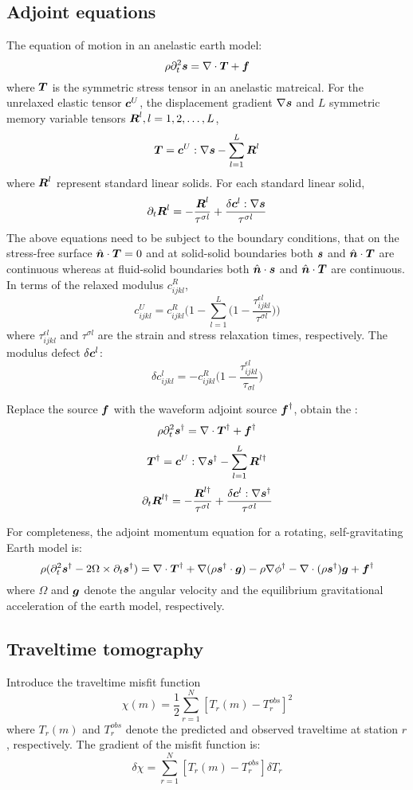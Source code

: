 \subsection{Adjoint equations}
The equation of motion in an anelastic earth model:
\[ \rho\partial_t^2\boldsymbol{s}=\nabla\cdot\boldsymbol{T}+\boldsymbol{f} \]
where $\boldsymbol{T}$ is the symmetric stress tensor in an anelastic matreical.
For the unrelaxed elastic tensor $\boldsymbol{c}^U$, the displacement gradient $\nabla\boldsymbol{s}$
and $L$ symmetric memory variable tensors $\boldsymbol{R}^l,l=1,2,\ldots,L$,
\[ \boldsymbol{T}=\boldsymbol{c}^U:\nabla\boldsymbol{s}-\sum_{l=1}^L\boldsymbol{R}^l \]
where $\boldsymbol{R}^l$ represent standard linear solids.
For each standard linear solid,
\[ \partial_t\boldsymbol{R}^l=-\frac{\boldsymbol{R}^l}{\tau^{\sigma l}}+\frac{\delta\boldsymbol{c}^l:\nabla\boldsymbol{s}}{\tau^{\sigma l}} \]
The above equations need to be subject to the boundary conditions,
that on the stress-free surface $\hat{\boldsymbol{n}}\cdot\boldsymbol{T}=0$
and at solid-solid boundaries
both $\boldsymbol{s}$ and $\hat{\boldsymbol{n}}\cdot\boldsymbol{T}$ are continuous
whereas at fluid-solid boundaries
both $\hat{\boldsymbol{n}}\cdot\boldsymbol{s}$ and $\hat{\boldsymbol{n}}\cdot\boldsymbol{T}$ are continuous.
In terms of the relaxed modulus $c_{ijkl}^R$,
\[ c_{ijkl}^U=c_{ijkl}^R\bigg(1-\sum_{l=1}^L\Big(1-\frac{\tau_{ijkl}^{\epsilon l}}{\tau^{\sigma l}}\Big)\bigg) \]
where $\tau_{ijkl}^{\epsilon l}$ and $\tau^{\sigma l}$
are the strain and stress relaxation times, respectively.
The modulus defect $\delta\boldsymbol{c}^l$:
\[ \delta c_{ijkl}^l=-c_{ijkl}^R\Big(1-\frac{\tau_{ijkl}^{\epsilon l}}{\tau_{\sigma l}}\Big) \]

Replace the source $\boldsymbol{f}$ with the waveform adjoint source $\boldsymbol{f}^\dagger$,
obtain the :
\[ \rho\partial_t^2\boldsymbol{s}^\dagger=\nabla\cdot\boldsymbol{T}^\dagger+\boldsymbol{f}^\dagger \]
\[ \boldsymbol{T}^\dagger=\boldsymbol{c}^U:\nabla\boldsymbol{s}^\dagger-\sum_{l=1}^L\boldsymbol{R}^{l\dagger} \]
\[ \partial_t\boldsymbol{R}^{l\dagger}=-\frac{\boldsymbol{R}^{l\dagger}}{\tau^{\sigma l}}+\frac{\delta\boldsymbol{c}^l:\nabla\boldsymbol{s}^\dagger}{\tau^{\sigma l}} \]

For completeness, the adjoint momentum equation for a rotating, self-gravitating Earth model is:
\[ \rho(\partial_t^2\boldsymbol{s}^\dagger-2\Omega\times\partial_t\boldsymbol{s}^\dagger)=\nabla\cdot\boldsymbol{T}^\dagger+\nabla(\rho\boldsymbol{s}^\dagger\cdot\boldsymbol{g})-\rho\nabla\phi^\dagger-\nabla\cdot(\rho\boldsymbol{s}^\dagger)\boldsymbol{g}+\boldsymbol{f}^\dagger \]
where $\Omega$ and $\boldsymbol{g}$
denote the angular velocity and the equilibrium gravitational acceleration of the earth model,
respectively.

\subsection{Traveltime tomography}
Introduce the traveltime misfit function
\[ \chi(m)=\frac{1}{2}\sum_{r=1}^N[T_r(m)-T_r^{obs}]^2 \]
where
$T_r(m)$ and $T_r^{obs}$ denote the predicted and observed traveltime at station $r$, respectively.
The gradient of the misfit function is:
\[ \delta\chi=\sum_{r=1}^N[T_r(m)-T_r^{obs}]\delta T_r \]

